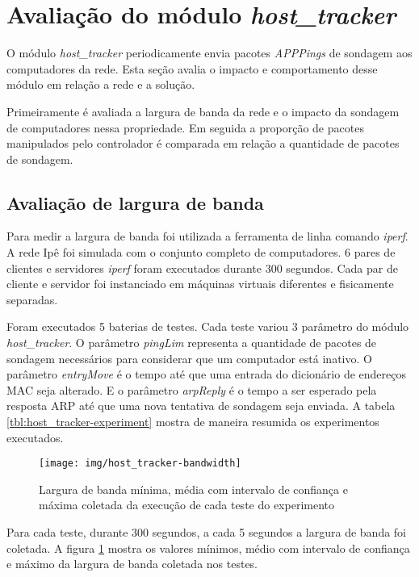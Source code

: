 \break
\section{Avaliação do módulo \emph{host\_tracker}}

O módulo \emph{host\_tracker} periodicamente envia pacotes \emph{APPPings} de
sondagem aos computadores da rede. 
Esta seção avalia o impacto e comportamento desse módulo em relação a rede e 
a solução.

Primeiramente é avaliada a largura de banda da rede e o impacto da sondagem 
de computadores nessa propriedade.
Em seguida a proporção de pacotes manipulados pelo controlador é comparada
em relação a quantidade de pacotes de sondagem.

\subsection{Avaliação de largura de banda}

Para medir a largura de banda foi utilizada a ferramenta de linha comando
\emph{iperf}.
A rede Ipê foi simulada com o conjunto completo de computadores.
6 pares de clientes e servidores \emph{iperf} foram executados durante 300 
segundos.
Cada par de cliente e servidor foi instanciado em máquinas virtuais 
diferentes e fisicamente separadas.



Foram executados 5 baterias de testes.
Cada teste variou 3 parâmetro do módulo \emph{host\_tracker}.
O parâmetro \emph{pingLim} representa a quantidade de pacotes de sondagem 
necessários para considerar que um computador está inativo.
O parâmetro \emph{entryMove} é o tempo até que uma entrada do dicionário de 
endereços MAC seja alterado.
E o parâmetro \emph{arpReply} é o tempo a ser esperado pela resposta ARP até
que uma nova tentativa de sondagem seja enviada.
A tabela \ref{tbl:host_tracker-experiment} mostra de maneira resumida os 
experimentos executados.

\begin{figure}[!htb]
    \centering
    \label{fig:host_tracker-bandwidth}
    \texttt{[image: img/host\_tracker-bandwidth]}
    \caption{Largura de banda mínima, média com intervalo de confiança e máxima
    coletada da execução de cada teste do experimento}
\end{figure}

Para cada teste, durante 300 segundos, a cada 5 segundos a largura de banda
foi coletada.
A figura \ref{fig:host_tracker-bandwidth} mostra os valores mínimos, médio 
com intervalo de confiança e máximo da largura de banda coletada nos testes.

